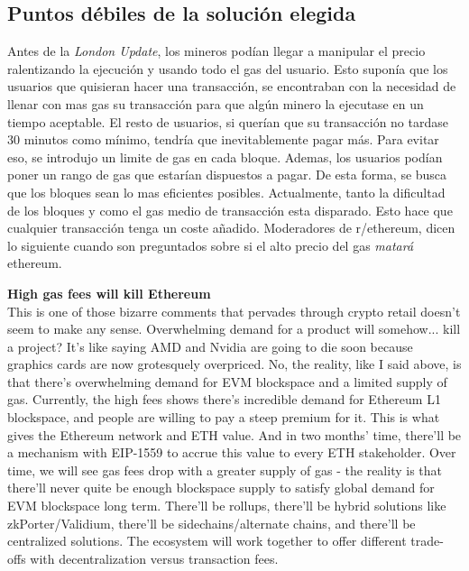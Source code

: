 \subsection{Puntos débiles de la solución elegida}
Antes de la \textit{London Update}, los mineros podían llegar a manipular el precio ralentizando la ejecución y usando todo el gas del usuario. Esto suponía que los usuarios que quisieran hacer una transacción, se encontraban con la necesidad de llenar con mas gas su transacción para que algún minero la ejecutase en un tiempo aceptable. El resto de usuarios, si querían que su transacción no tardase 30 minutos como mínimo, tendría que inevitablemente pagar más.
Para evitar eso, se introdujo un limite de gas en cada bloque. Ademas, los usuarios podían poner un rango de gas que estarían dispuestos a pagar. De esta forma, se busca que los bloques sean lo mas eficientes posibles.
Actualmente, tanto la dificultad de los bloques y como el gas medio de transacción esta disparado\cite{web:gas_price}. Esto hace que cualquier transacción tenga un coste añadido. Moderadores de r/ethereum, dicen lo siguiente cuando son preguntados sobre si el alto precio del gas \textit{matará} ethereum.
\begin{displayquote}
    \textbf{High gas fees will kill Ethereum}\\
    This is one of those bizarre comments that pervades through crypto retail doesn't seem to make any sense. Overwhelming demand for a product will somehow... kill a project? It's like saying AMD and Nvidia are going to die soon because graphics cards are now grotesquely overpriced.
    No, the reality, like I said above, is that there's overwhelming demand for EVM blockspace and a limited supply of gas. Currently, the high fees shows there's incredible demand for Ethereum L1 blockspace, and people are willing to pay a steep premium for it.
    This is what gives the Ethereum network and ETH value. And in two months' time, there'll be a mechanism with EIP-1559 to accrue this value to every ETH stakeholder.
    Over time, we will see gas fees drop with a greater supply of gas - the reality is that there'll never quite be enough blockspace supply to satisfy global demand for EVM blockspace long term. There'll be rollups, there'll be hybrid solutions like zkPorter/Validium, there'll be sidechains/alternate chains, and there'll be centralized solutions. The ecosystem will work together to offer different trade-offs with decentralization versus transaction fees.
    \cite{web:reddit_ethereum}
\end{displayquote}
